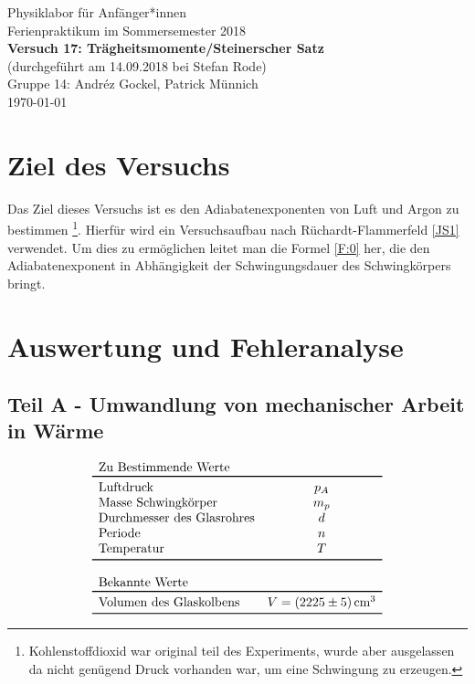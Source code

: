 \documentclass[11pt,a4paper]{article}
\begin{document}
{
\centering 
\large 
Physiklabor für Anf\"anger*innen \\
Ferienpraktikum im Sommersemester 2018 \\[4mm]
\textbf{\LARGE 
Versuch 17: Trägheitsmomente/Steinerscher Satz
} \\[3mm]
(durchgef\"uhrt am 14.09.2018 bei Stefan Rode)\\
Gruppe 14: Andréz Gockel, Patrick M\"unnich\\ 
\today \\[10mm]
}

\section{Ziel des Versuchs}

Das Ziel dieses Versuchs ist es den Adiabatenexponenten von Luft und Argon zu bestimmen \footnote{Kohlenstoffdioxid war original teil des Experiments, wurde aber ausgelassen da nicht genügend Druck vorhanden war, um eine Schwingung zu erzeugen.}. Hierfür wird ein Versuchsaufbau nach Rüchardt-Flammerfeld \ref{JS1} verwendet. Um dies zu ermöglichen leitet man die Formel \ref{F:0} her, die den Adiabatenexponent in Abhängigkeit der Schwingungsdauer des Schwingkörpers bringt.


\section{Auswertung und Fehleranalyse}

\subsection{Teil A - Umwandlung von mechanischer Arbeit in Wärme }
$$
\begin{array}{lc}
	\multicolumn{1}{l}{\textrm{Zu Bestimmende Werte}} \\
	\toprule 
	\textrm{Luftdruck} & p_A \\
	\textrm{Masse Schwingkörper} & m_{p} \\
	\textrm{Durchmesser des Glasrohres} & d\\
	\textrm{Periode} & n \\
	\textrm{Temperatur} & T\\
	\bottomrule \\
	\multicolumn{2}{l}{\textrm{Bekannte Werte}} \\
	\toprule
	\textrm{Volumen des Glaskolbens} & V = (2225 \pm 5)\,\textrm{cm}^3\\
	\bottomrule 
\end{array}
$$
\end{document}
